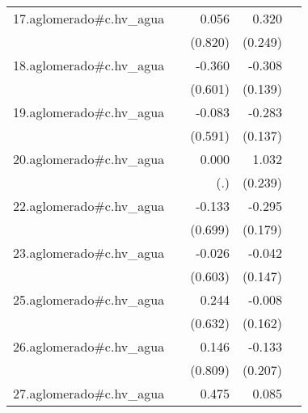 {\begin{longtable}{l*{4}{D{.}{.}{-1}}}
\addlinespace
17.aglomerado#c.hv\_agua&                     &       0.056         &       0.320         &                     \\
            &                     &     (0.820)         &     (0.249)         &                     \\
\addlinespace
18.aglomerado#c.hv\_agua&                     &      -0.360         &      -0.308\sym{*}  &                     \\
            &                     &     (0.601)         &     (0.139)         &                     \\
\addlinespace
19.aglomerado#c.hv\_agua&                     &      -0.083         &      -0.283\sym{*}  &                     \\
            &                     &     (0.591)         &     (0.137)         &                     \\
\addlinespace
20.aglomerado#c.hv\_agua&                     &       0.000         &       1.032\sym{***}&                     \\
            &                     &         (.)         &     (0.239)         &                     \\
\addlinespace
22.aglomerado#c.hv\_agua&                     &      -0.133         &      -0.295         &                     \\
            &                     &     (0.699)         &     (0.179)         &                     \\
\addlinespace
23.aglomerado#c.hv\_agua&                     &      -0.026         &      -0.042         &                     \\
            &                     &     (0.603)         &     (0.147)         &                     \\
\addlinespace
25.aglomerado#c.hv\_agua&                     &       0.244         &      -0.008         &                     \\
            &                     &     (0.632)         &     (0.162)         &                     \\
\addlinespace
26.aglomerado#c.hv\_agua&                     &       0.146         &      -0.133         &                     \\
            &                     &     (0.809)         &     (0.207)         &                     \\
\addlinespace
27.aglomerado#c.hv\_agua&                     &       0.475         &       0.085         &                     \\

\end{longtable}}
